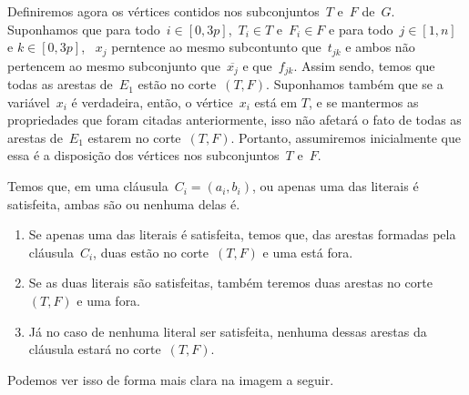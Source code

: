 \documentclass[a4paper,12pt]{article}
\begin{document}
		Definiremos agora os vértices contidos nos 
		subconjuntos~$T$ e~$F$ de~$G$.
		Suponhamos que para todo~$i\in[0,3p]$,~$T_i\in T$ e~$F_i\in F$ e
		para todo~$j\in[1,n]$ e $k\in[0,3p]$, ~$x_j$ perntence ao 
		mesmo subcontunto que~$t_{jk}$ e ambos
		 não pertencem ao mesmo 
		subconjunto que~$\overline{x_j}$ e que~$f_{jk}$.
		Assim sendo, temos que todas as arestas de~$E_1$ estão no 
		corte~$(T,F)$.
		Suponhamos também que se a variável~$x_i$ é verdadeira,
		então, o vértice~$x_i$ está em $T$, e se mantermos as 
		propriedades que foram citadas anteriormente, isso não afetará o 
		fato de todas as arestas de~$E_1$ estarem no corte~$(T,F)$.
		Portanto, assumiremos inicialmente que essa é a disposição dos 
		vértices nos subconjuntos~$T$ e~$F$.

		Temos que, em uma cláusula~$C_i=(a_i,b_i)$, ou
		apenas uma das literais é satisfeita, ambas são ou nenhuma
		delas é.
		\begin{enumerate}
			\item Se apenas uma das literais é satisfeita, temos que,
			das arestas formadas pela cláusula~$C_i$, duas
			estão no corte~$(T,F)$ e uma está fora.
			\item Se as duas literais são satisfeitas, também teremos
			duas arestas no corte~$(T,F)$ e uma fora.
			\item Já no caso de nenhuma literal ser satisfeita, nenhuma
			dessas arestas da cláusula estará no corte~$(T,F)$.
		\end{enumerate}

		Podemos ver isso de forma mais clara na imagem a seguir.
\end{document}
